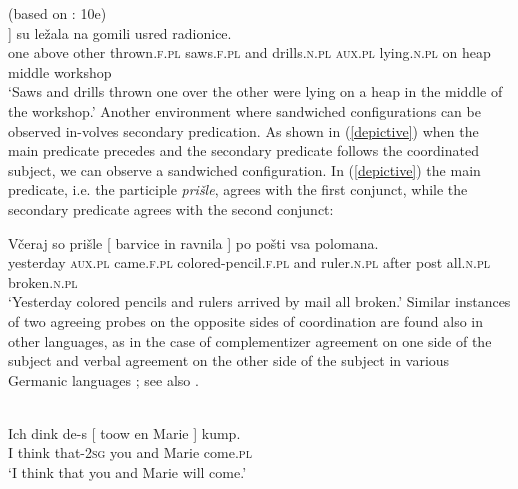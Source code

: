 \documentclass[output=paper
,modfonts
,nonflat]{langsci/langscibook}
\begin{document}
\ea \label{jednenadruge} (based on \citealt{aljovicbegovic:16}: 10e)\\
\gll [ Jedne na druge nabacane [ testere i svrdla ]]  su  ležala  na gomili usred radionice. \\
{} one above other  thrown.\textsc{f.pl} {} saws.\textsc{f.pl} and drills.\textsc{n.pl} {}  \textsc{aux.pl} lying.\textsc{n.pl} on heap  middle workshop\\
\glt `Saws and drills thrown one over the other were lying on a heap in the middle of the workshop.'
\z
Another environment where sandwiched configurations can be observed in-\linebreak volves secondary predication. As shown in (\ref{depictive}) when the main predicate precedes and the secondary predicate follows the coordinated subject, we can observe a sandwiched configuration. In (\ref{depictive}) the main predicate, i.e. the participle \textit{prišle}, agrees with the first conjunct, while the secondary predicate agrees with the second conjunct:

\ea \label{depictive}
\gll Včeraj so prišle [ barvice in ravnila ] po pošti vsa polomana.\\
yesterday \textsc{aux.pl} came.\textsc{f.pl} {} colored-pencil.\textsc{f.pl} and ruler.\textsc{n.pl} {} after post all.\textsc{n.pl} broken.\textsc{n.pl}\\
\glt `Yesterday colored pencils and rulers arrived by mail all broken.'
\z
Similar instances of two agreeing probes on the opposite sides of coordination are found also in other languages, as in the case of complementizer agreement on one side of the subject and verbal agreement on the other side of the subject in various Germanic languages \citep{koppen:05, haegemankoppen:12, bayer:12}; see also .

\ea {}\\
\gll Ich dink de-s [ toow en Marie ] kump. \\
I think that-\textsc{2sg} {} you and Marie {} come.\textsc{pl} \\
\glt `I think that you and Marie will come.'
\z
\end{document}
